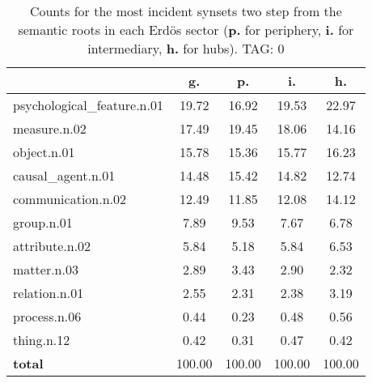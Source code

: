 \begin{table}[h!]
\begin{center}
\begin{tabular}{| l | c | c | c | c |}\hline
 & g. & p. & i. & h. \\\hline
psychological\_feature.n.01 & 19.72  & 16.92  & 19.53  & 22.97 \\\hline
measure.n.02 & 17.49  & 19.45  & 18.06  & 14.16 \\\hline
object.n.01 & 15.78  & 15.36  & 15.77  & 16.23 \\\hline
causal\_agent.n.01 & 14.48  & 15.42  & 14.82  & 12.74 \\\hline
communication.n.02 & 12.49  & 11.85  & 12.08  & 14.12 \\\hline
group.n.01 & 7.89  & 9.53  & 7.67  & 6.78 \\\hline
attribute.n.02 & 5.84  & 5.18  & 5.84  & 6.53 \\\hline
matter.n.03 & 2.89  & 3.43  & 2.90  & 2.32 \\\hline
relation.n.01 & 2.55  & 2.31  & 2.38  & 3.19 \\\hline
process.n.06 & 0.44  & 0.23  & 0.48  & 0.56 \\\hline
thing.n.12 & 0.42  & 0.31  & 0.47  & 0.42 \\\hline
{{\bf total}} & 100.00  & 100.00  & 100.00  & 100.00 \\\hline
\end{tabular}
\caption{Counts for the most incident synsets two step from the semantic roots in each Erd\"os sector ({\bf p.} for periphery, {\bf i.} for intermediary, {\bf h.} for hubs). TAG: 0}
\end{center}
\end{table}